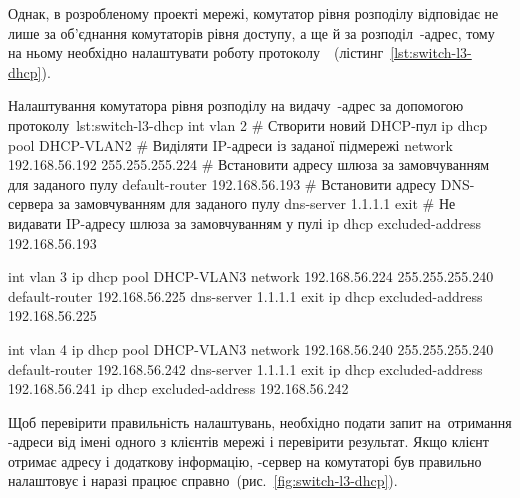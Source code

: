 \documentclass[
  ukrainian,
  simple,
  floatsection,
]{eskdnaukvd}
\begin{document}
      Однак, в розробленому проекті мережі, комутатор рівня розподілу відповідає не лише за об'єднання комутаторів рівня доступу, а ще й за розподіл~\textenglish{}-адрес, тому на ньому необхідно налаштувати роботу протоколу~\textenglish{}~(лістинг~\ref{lst:switch-l3-dhcp}).

      \begin{listingplaintext}{Налаштування комутатора рівня розподілу на видачу~\textenglish{}-адрес за допомогою протоколу~\textenglish{}}{lst:switch-l3-dhcp}
        int vlan 2
        # Створити новий DHCP-пул
        ip dhcp pool DHCP-VLAN2
        # Виділяти IP-адреси із заданої підмережі
        network 192.168.56.192 255.255.255.224
        # Встановити адресу шлюза за замовчуванням для заданого пулу
        default-router 192.168.56.193
        # Встановити адресу DNS-сервера за замовчуванням для заданого пулу
        dns-server 1.1.1.1
        exit
        # Не видавати IP-адресу шлюза за замовчуванням у пулі
        ip dhcp excluded-address 192.168.56.193

        int vlan 3
        ip dhcp pool DHCP-VLAN3
        network 192.168.56.224 255.255.255.240
        default-router 192.168.56.225
        dns-server 1.1.1.1
        exit
        ip dhcp excluded-address 192.168.56.225

        int vlan 4
        ip dhcp pool DHCP-VLAN3
        network 192.168.56.240 255.255.255.240
        default-router 192.168.56.242
        dns-server 1.1.1.1
        exit
        ip dhcp excluded-address 192.168.56.241
        ip dhcp excluded-address 192.168.56.242
      \end{listingplaintext}

      Щоб перевірити правильність налаштувань, необхідно подати запит на~отримання \textenglish{}-адреси від імені одного з клієнтів мережі і перевірити результат. Якщо клієнт отримає адресу і додаткову інформацію, \textenglish{}-сервер на комутаторі був правильно налаштовує і наразі працює справно~(рис.~\ref{fig:switch-l3-dhcp}).
\end{document}
